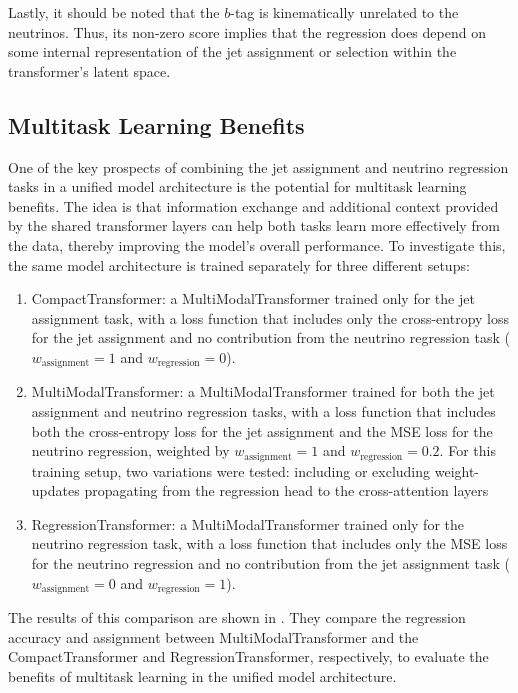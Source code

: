 Lastly, it should be noted that the $b$-tag is kinematically unrelated to the neutrinos. Thus, its non-zero score implies that the regression does depend on some internal representation of the jet assignment or selection within the transformer's latent space.

\subsection{Multitask Learning Benefits}
\label{sec:multitask-learning-benefits}
One of the key prospects of combining the jet assignment and neutrino regression tasks in a unified model architecture is the potential for multitask learning benefits. The idea is that information exchange and additional context provided by the shared transformer layers can help both tasks learn more effectively from the data, thereby improving the model's overall performance. To investigate this, the same model architecture is trained separately for three different setups:
\begin{enumerate}
    \item CompactTransformer: a MultiModalTransformer trained only for the jet assignment task, with a loss function that includes only the cross-entropy loss for the jet assignment and no contribution from the neutrino regression task ($w_{\text{assignment}}=1$ and $w_{\text{regression}}=0$).
    \item MultiModalTransformer: a MultiModalTransformer trained for both the jet assignment and neutrino regression tasks, with a loss function that includes both the cross-entropy loss for the jet assignment and the MSE loss for the neutrino regression, weighted by $w_{\text{assignment}}=1$ and $w_{\text{regression}}=0.2$. For this training setup, two variations were tested: including or excluding weight-updates propagating from the regression head to the cross-attention layers
    \item RegressionTransformer: a MultiModalTransformer trained only for the neutrino regression task, with a loss function that includes only the MSE loss for the neutrino regression and no contribution from the jet assignment task ($w_{\text{assignment}}=0$ and $w_{\text{regression}}=1$).
\end{enumerate}
The results of this comparison are shown in .
They compare the regression accuracy and assignment between MultiModalTransformer and the CompactTransformer and RegressionTransformer, respectively, to evaluate the benefits of multitask learning in the unified model architecture.
